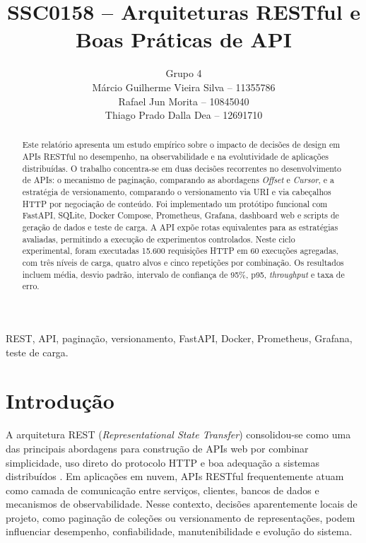 \documentclass[journal]{IEEEtran}
\begin{document}
\title{SSC0158 -- Arquiteturas RESTful e Boas Práticas de API}

\author{Grupo 4\\
Márcio Guilherme Vieira Silva -- 11355786\\
Rafael Jun Morita -- 10845040\\
Thiago Prado Dalla Dea -- 12691710}

\maketitle

\begin{abstract}
Este relatório apresenta um estudo empírico sobre o impacto de decisões de design em APIs RESTful no desempenho, na observabilidade e na evolutividade de aplicações distribuídas. O trabalho concentra-se em duas decisões recorrentes no desenvolvimento de APIs: o mecanismo de paginação, comparando as abordagens \textit{Offset} e \textit{Cursor}, e a estratégia de versionamento, comparando o versionamento via URI e via cabeçalhos HTTP por negociação de conteúdo. Foi implementado um protótipo funcional com FastAPI, SQLite, Docker Compose, Prometheus, Grafana, dashboard web e scripts de geração de dados e teste de carga. A API expõe rotas equivalentes para as estratégias avaliadas, permitindo a execução de experimentos controlados. Neste ciclo experimental, foram executadas 15.600 requisições HTTP em 60 execuções agregadas, com três níveis de carga, quatro alvos e cinco repetições por combinação. Os resultados incluem média, desvio padrão, intervalo de confiança de 95\%, p95, \textit{throughput} e taxa de erro.
\end{abstract}

\begin{IEEEkeywords}
REST, API, paginação, versionamento, FastAPI, Docker, Prometheus, Grafana, teste de carga.
\end{IEEEkeywords}

\section{Introdução}

A arquitetura REST (\textit{Representational State Transfer}) consolidou-se como uma das principais abordagens para construção de APIs web por combinar simplicidade, uso direto do protocolo HTTP e boa adequação a sistemas distribuídos \cite{fielding2000}. Em aplicações em nuvem, APIs RESTful frequentemente atuam como camada de comunicação entre serviços, clientes, bancos de dados e mecanismos de observabilidade. Nesse contexto, decisões aparentemente locais de projeto, como paginação de coleções ou versionamento de representações, podem influenciar desempenho, confiabilidade, manutenibilidade e evolução do sistema.
\end{document}
